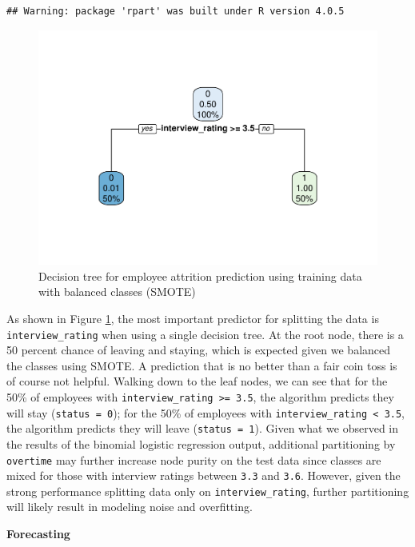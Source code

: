 \documentclass[
]{book}
\begin{document}
\begin{verbatim}
## Warning: package 'rpart' was built under R version 4.0.5
\end{verbatim}

\begin{figure}

{\centering \includegraphics[width=0.75\linewidth]{The_Fundamentals_of_People_Analytics_files/figure-latex/rpart-tree-1} 

}

\caption{Decision tree for employee attrition prediction using training data with balanced classes (SMOTE)}\label{fig:rpart-tree}
\end{figure}

As shown in Figure \ref{fig:rpart-tree}, the most important predictor for splitting the data is \texttt{interview\_rating} when using a single decision tree. At the root node, there is a 50 percent chance of leaving and staying, which is expected given we balanced the classes using SMOTE. A prediction that is no better than a fair coin toss is of course not helpful. Walking down to the leaf nodes, we can see that for the 50\% of employees with \texttt{interview\_rating\ \textgreater{}=\ 3.5}, the algorithm predicts they will stay (\texttt{status\ =\ 0}); for the 50\% of employees with \texttt{interview\_rating\ \textless{}\ 3.5}, the algorithm predicts they will leave (\texttt{status\ =\ 1}). Given what we observed in the results of the binomial logistic regression output, additional partitioning by \texttt{overtime} may further increase node purity on the test data since classes are mixed for those with interview ratings between \texttt{3.3} and \texttt{3.6}. However, given the strong performance splitting data only on \texttt{interview\_rating}, further partitioning will likely result in modeling noise and overfitting.

\textbf{Forecasting}
\end{document}
